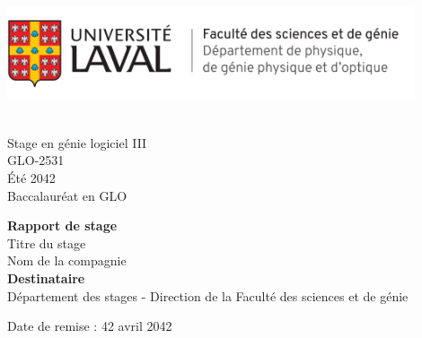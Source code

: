 \documentclass[12pt]{article} 	%
\newcommand\titreDuCours{Stage en génie logiciel III}
\newcommand\sigleCoursStage{GLO-2531}
\newcommand\session{Été 2042}
\newcommand\acronymeDuBac{GLO}
\newcommand\titreStage{Titre du stage}
\newcommand\nomCompagnie{Nom de la compagnie}
\newcommand\dateRemise{42 avril 2042}
\newcommand\distanceEnteteEtNomStage{4cm}
\newcommand\distanceTypeRapportEtDestinataire{5cm}
\begin{document}
\thispagestyle{empty}
\begin{minipage}[t]{8.5cm}
    \vspace{0pt}
    \begin{flushleft}
        \hspace{-1cm}\includegraphics[width=12cm]{img/Logo_Ulaval.png}\\
    \end{flushleft}
\end{minipage}
\begin{minipage}[t]{8.5cm}
    \begin{flushright}
        \hspace*{2cm} \\
        \hspace*{1cm}\titreDuCours\\
        \hspace*{1cm}\sigleCoursStage\\
        \hspace*{1cm}\session\\
        \hspace*{1cm}Baccalauréat en {\acronymeDuBac}\\
    \end{flushright}
\end{minipage}

\vspace{\distanceEnteteEtNomStage}
\begin{center}
    
    \fontsize{14.4}{14.4}\large \textbf{Rapport de stage}\\
    \vspace{1cm}
    \large {\titreStage}  \\
\vspace{0.2cm}
    {\nomCompagnie} \\
    \vspace{\distanceTypeRapportEtDestinataire}
    \fontsize{14.4}{14.4}\textbf {Destinataire}\\
    \large Département des stages  - Direction de la Faculté des sciences et de génie \\
\end{center}
\vspace{2cm}
\begin{flushleft}
    Date de remise : {\dateRemise}
\end{flushleft}
\end{document}
